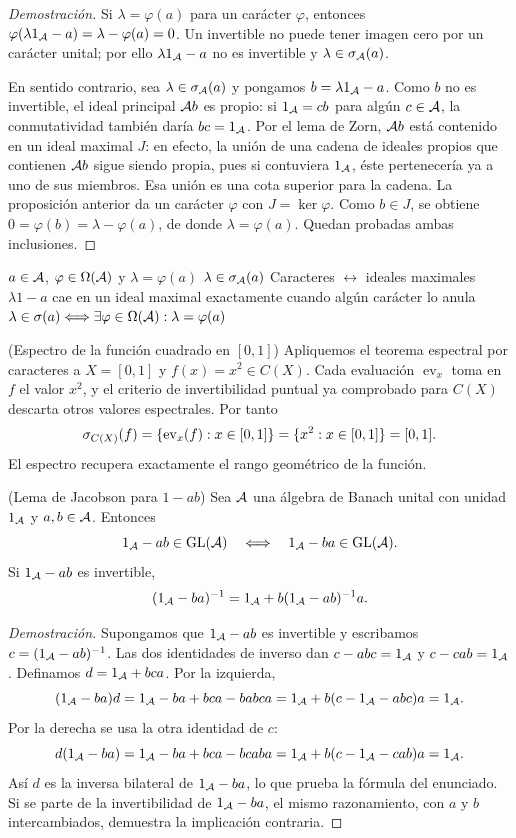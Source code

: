 \begin{proof}[Demostración]
Si $\lambda=\varphi(a)$ para un carácter $\varphi$, entonces
$\varphi(\lambda1_\mathcal A-a)=\lambda-\varphi(a)=0$.
Un invertible no puede tener imagen cero por un carácter unital;
por ello $\lambda1_\mathcal A-a$ no es invertible y
$\lambda\in\sigma_\mathcal A(a)$.

En sentido contrario, sea $\lambda\in\sigma_\mathcal A(a)$ y pongamos
$b=\lambda1_\mathcal A-a$. Como $b$ no es invertible, el ideal principal
$\mathcal A b$ es propio: si $1_\mathcal A=cb$ para algún $c\in\mathcal A$, la
conmutatividad también daría $bc=1_\mathcal A$. Por el lema de Zorn,
$\mathcal A b$ está contenido en un ideal maximal $J$: en efecto, la unión
de una cadena de ideales propios que contienen $\mathcal A b$ sigue siendo
propia, pues si contuviera $1_\mathcal A$, éste pertenecería ya a uno de
sus miembros. Esa unión es una cota superior para la cadena.
La proposición
anterior da un carácter $\varphi$ con $J=\ker\varphi$.
Como $b\in J$, se obtiene
$0=\varphi(b)=\lambda-\varphi(a)$, de donde
$\lambda=\varphi(a)$. Quedan probadas ambas inclusiones.
\end{proof}

\proofdiagrambranch
{$a\in\mathcal A$, $\varphi\in\Omega(\mathcal A)$ y $\lambda=\varphi(a)$}
{$\lambda\in\sigma_\mathcal A(a)$}
{Caracteres $\leftrightarrow$ ideales maximales}
{$\lambda1-a$ cae en un ideal maximal exactamente cuando algún carácter lo anula}
{$\lambda\in\sigma(a)\Longleftrightarrow\exists\varphi\in\Omega(\mathcal A):\lambda=\varphi(a)$}

\begin{cthejemplo}{(Espectro de la función cuadrado en $[0,1]$)}
Apliquemos el teorema espectral por caracteres a
$X=[0,1]$ y $f(x)=x^2\in C(X)$.
Cada evaluación $\operatorname{ev}_x$ toma en $f$ el valor $x^2$,
y el criterio de invertibilidad puntual ya comprobado para $C(X)$
descarta otros valores espectrales. Por tanto
\[
 \sigma_{C(X)}(f)
 =\{\operatorname{ev}_x(f):x\in[0,1]\}
 =\{x^2:x\in[0,1]\}=[0,1].
\]
El espectro recupera exactamente el rango geométrico de la función.
\end{cthejemplo}

\begin{cthproposicion}{(Lema de Jacobson para $1-ab$)}
Sea $\mathcal A$ una álgebra de Banach unital con unidad $1_\mathcal A$ y
$a,b\in\mathcal A$. Entonces
\[
 1_\mathcal A-ab\in\operatorname{GL}(\mathcal A)\quad\Longleftrightarrow\quad 1_\mathcal A-ba\in\operatorname{GL}(\mathcal A).
\]
Si $1_\mathcal A-ab$ es invertible,
\[
 (1_\mathcal A-ba)^{-1}=1_\mathcal A+b(1_\mathcal A-ab)^{-1}a.
\]
\end{cthproposicion}

\begin{proof}[Demostración]
Supongamos que $1_\mathcal A-ab$ es invertible y escribamos
$c=(1_\mathcal A-ab)^{-1}$. Las dos identidades de inverso dan
$c-abc=1_\mathcal A$ y $c-cab=1_\mathcal A$.
Definamos $d=1_\mathcal A+bca$. Por la izquierda,
\[
 (1_\mathcal A-ba)d
 =1_\mathcal A-ba+bca-babca
 =1_\mathcal A+b(c-1_\mathcal A-abc)a=1_\mathcal A.
\]
Por la derecha se usa la otra identidad de $c$:
\[
 d(1_\mathcal A-ba)
 =1_\mathcal A-ba+bca-bcaba
 =1_\mathcal A+b(c-1_\mathcal A-cab)a=1_\mathcal A.
\]
Así $d$ es la inversa bilateral de $1_\mathcal A-ba$, lo que prueba
la fórmula del enunciado. Si se parte de la invertibilidad de
$1_\mathcal A-ba$, el mismo razonamiento, con $a$ y $b$ intercambiados,
demuestra la implicación contraria.
\end{proof}

